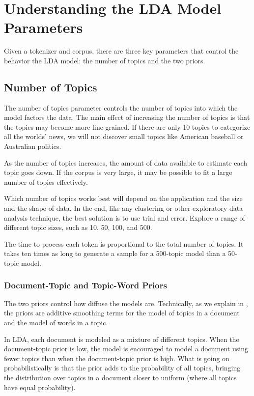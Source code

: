\section{Understanding the LDA Model Parameters}

Given a tokenizer and corpus, there are three key parameters that
control the behavior the LDA model: the number of topics and the two
priors.

\subsection{Number of Topics}

The number of topics parameter controls the number of topics into
which the model factors the data.  The main effect of increasing the
number of topics is that the topics may become more fine grained.  If
there are only 10 topics to categorize all the worlds' news, we will
not discover small topics like American baseball or Australian
politics.  

As the number of topics increases, the amount of data available
to estimate each topic goes down.  If the corpus is very large,
it may be possible to fit a large number of topics effectively.

Which number of topics works best will depend on the application and
the size and the shape of data.  In the end, like any clustering or
other exploratory data analysis technique, the best solution is to use
trial and error.  Explore a range of different topic sizes, such as
10, 50, 100, and 500.

The time to process each token is proportional to the total number of
topics.  It takes ten times as long to generate a sample for a
500-topic model than a 50-topic model.

\subsubsection{Document-Topic and Topic-Word Priors}

The two priors control how diffuse the models are.  Technically,
as we explain in , the priors are additive
smoothing terms for the model of topics in a document and
the model of words in a topic.

In LDA, each document is modeled as a mixture of different topics.
When the document-topic prior is low, the model is encouraged to model
a document using fewer topics than when the document-topic prior is
high.  What is going on probabilistically is that the prior adds to
the probability of all topics, bringing the distribution over topics
in a document closer to uniform (where all topics have equal
probability).

